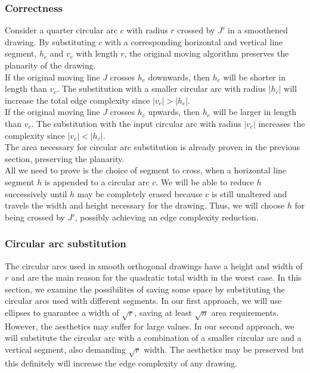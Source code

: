 \subsubsection*{Correctness}
Consider a quarter circular arc $c$ with radius $r$ crossed by $J'$ in a smoothened drawing. By substituting $c$ with a corresponding horizontal and vertical line segment, $h_c$ and $v_c$ with length $r$, the original moving algorithm preserves the planarity of the drawing.
\\
If the original moving line $J$ crosses $h_c$ downwards, then $h_c$ will be shorter in length than $v_c$. The substitution with a smaller circular arc with radius $|h_c|$ will increase the total edge complexity since $|v_c| > |h_c|$.
\\If the original moving line $J$ crosses $h_c$ upwards, then $h_c$ will be larger in length than $v_c$. The substitution with the input circular arc with radius $|v_c|$ increases the complexity since $|v_c| < |h_c|$. 
\\The area necessary for circular arc substitution is already proven in the previous section, preserving the planarity.
\\All we need to prove is the choice of segment to cross, when a horizontal line segment $h$ is appended to a circular arc $c$. We will be able to reduce $h$ successively until $h$ may be completely erased because $c$ is still unaltered and travels the width and height necessary for the drawing. Thus, we will choose $h$ for being crossed by $J'$, possibly achieving an edge complexity reduction.
\subsubsection{Circular arc substitution}
The circular arcs used in smooth orthogonal drawings have a height and width of $r$ and are the main reason for the quadratic total width in the worst case. In this section, we examine the possibilites of saving some space by substituting the circular arcs used with different segments. In our first approach, we will use ellipses to guarantee a width of $\sqrt{r}$, saving at least $\sqrt{n}$ area requirements. However, the aesthetics may suffer for large values. In our second approach, we will substitute the circular arc with a combination of a smaller circular arc and a vertical segment, also demanding $\sqrt{r}$ width. The aesthetics may be preserved but this definitely will increase the edge complexity of any drawing.
